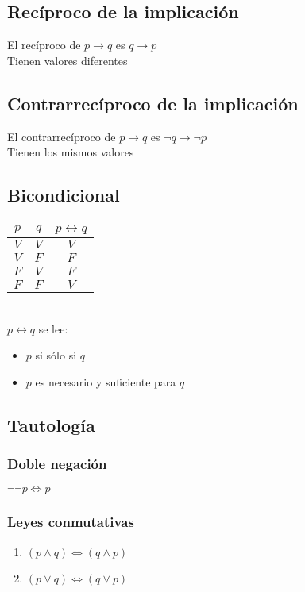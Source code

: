 \subsection{Rec\'iproco de la implicaci\'on}
    El rec\'iproco de $p \rightarrow q$  es $q \rightarrow p$\\ 
    Tienen valores diferentes\\
 
\subsection{Contrarrec\'iproco de la implicaci\'on }
     El contrarrec\'iproco de $p \rightarrow q$  es $\neg q \rightarrow \neg p$\\ 
     Tienen los mismos valores \\

  \subsection{Bicondicional}

  \begin{tabular}{ccc}
    $p$  & $q$ & $p \leftrightarrow q$ \\ \hline
    $V$ & $V$ & $V$ \\
    $V$ & $F$ &$F$ \\
    $F$ & $V$ & $F$ \\
    $F$ & $F$ & $V$\\
  \end{tabular} \\

  $p \leftrightarrow q$ se lee:
  \begin{itemize}
   \item $p$ si s\'olo si $q$
    \item $p$ es necesario y suficiente para $q$
  \end{itemize}

  \subsection{Tautolog\'ia}
    \subsubsection{Doble negaci\'on}
      $\neg \neg p \Leftrightarrow p$ \\
    
    \subsubsection{Leyes conmutativas}
      \renewcommand{\labelenumi}{\alph{enumi})}
	\begin{enumerate}
      \item $(p \wedge q) \Leftrightarrow (q \wedge p)$\\

      \item $(p \vee q) \Leftrightarrow (q \vee p)$\\
	\end{enumerate}
	

